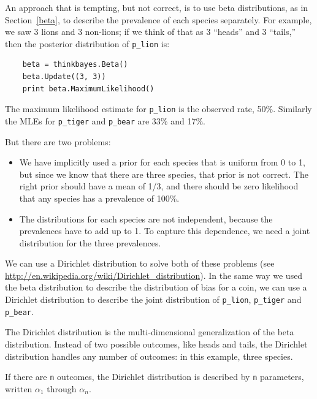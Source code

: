 \documentclass[12pt]{book}
\begin{document}
An approach that is tempting, but not correct, is to use beta
distributions, as in Section~\ref{beta}, to describe the prevalence of
each species separately.  For example, we saw 3 lions and 3 non-lions;
if we think of that as 3 ``heads'' and 3 ``tails,'' then the posterior
distribution of \verb"p_lion" is:

\begin{verbatim}
    beta = thinkbayes.Beta()
    beta.Update((3, 3))
    print beta.MaximumLikelihood()
\end{verbatim}

The maximum likelihood estimate for \verb"p_lion" is the observed
rate, 50\%.  Similarly the MLEs for \verb"p_tiger" and \verb"p_bear"
are 33\% and 17\%.

But there are two problems:

\begin{itemize}

\item We have implicitly used a prior for each species that is uniform
  from 0 to 1, but since we know that there are three species, that
  prior is not correct.  The right prior should have a mean of 1/3,
  and there should be zero likelihood that any species has a
  prevalence of 100\%.

\item The distributions for each species are not independent, because
  the prevalences have to add up to 1.  To capture this dependence, we
  need a joint distribution for the three prevalences.

\end{itemize}

We can use a Dirichlet distribution to solve both of these problems
(see \url{http://en.wikipedia.org/wiki/Dirichlet_distribution}).  In
the same way we used the beta distribution to describe the
distribution of bias for a coin, we can use a Dirichlet
distribution to describe the joint distribution of \verb"p_lion",
\verb"p_tiger" and \verb"p_bear".

The Dirichlet distribution is the multi-dimensional generalization
of the beta distribution.  Instead of two possible outcomes, like
heads and tails, the Dirichlet distribution handles any number of
outcomes: in this example, three species.

If there are {\tt n} outcomes, the Dirichlet distribution is
described by {\tt n} parameters, written $\alpha_1$ through $\alpha_n$.
\end{document}
